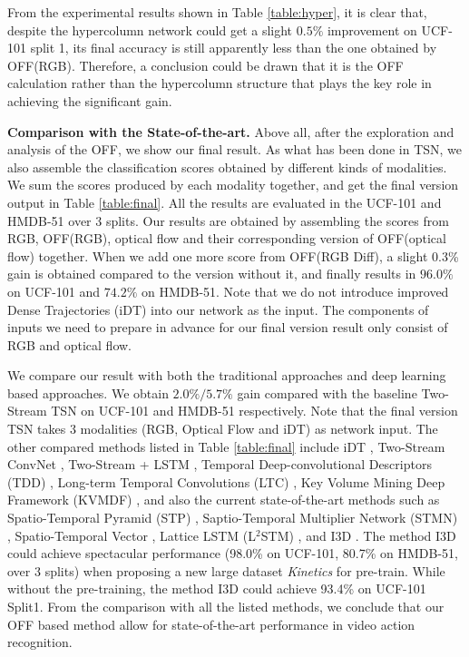 \documentclass[10pt,twocolumn,letterpaper]{article}
\begin{document}
From the experimental results shown in Table \ref{table:hyper}, it is clear that, despite the hypercolumn network could get a slight $0.5\%$ improvement on UCF-101 split 1, its final accuracy is still apparently less than the one obtained by OFF(RGB). Therefore, a conclusion could be drawn that it is the OFF calculation rather than the hypercolumn  structure that plays the key role in achieving the significant gain.

\textbf{Comparison with the State-of-the-art.} Above all, after the exploration and analysis of the OFF, we show our final result. As what has been done in TSN, we also assemble the classification scores obtained by different kinds of modalities. We sum the scores produced by each modality together, and get the final version output in Table \ref{table:final}. All the results are evaluated in the UCF-101 and HMDB-51 over 3 splits. Our results are obtained by assembling the scores from RGB, OFF(RGB), optical flow and their corresponding version of OFF(optical flow) together. When we add one more score from OFF(RGB Diff), a slight 0.3\% gain is obtained compared to the version without it, and finally results in $96.0\%$ on UCF-101 and $74.2\%$ on HMDB-51. Note that we do not introduce improved Dense Trajectories (iDT)\cite{wang2013idt} into our network as the input. The components of inputs we need to prepare in advance  for our final version result only consist of RGB and optical flow.


We compare our result with both the traditional approaches and deep learning based approaches. We obtain $2.0\%/5.7\%$ gain compared with the baseline Two-Stream TSN \cite{wang2016tsn} on UCF-101 \cite{khu2012ucf101} and HMDB-51 \cite{Kuehne11hmdb} respectively. Note that the final version TSN takes 3 modalities (RGB, Optical Flow and iDT) as network input. The other compared methods listed in Table \ref{table:final} include iDT \cite{wang2013idt}, Two-Stream ConvNet \cite{simonyan2014two}, Two-Stream + LSTM \cite{yue2015beyondshortlstm}, Temporal Deep-convolutional Descriptors (TDD) \cite{wang2015tdd}, Long-term Temporal Convolutions (LTC) \cite{varol2017ltc}, Key Volume Mining Deep Framework (KVMDF) \cite{zhu2016kvmf}, and also the current state-of-the-art methods such as Spatio-Temporal Pyramid (STP) \cite{wang2017spatiotemporalpyramid}, Saptio-Temporal Multiplier Network (STMN) \cite{feichtenhofer2017spatio-temp-multiplier}, Spatio-Temporal Vector \cite{cosmin2017stvector}, Lattice LSTM (L$^2$STM) \cite{sun2017lattice}, and I3D \cite{carreira2017i3d}. The method I3D could achieve spectacular performance (98.0\% on UCF-101, 80.7\% on HMDB-51, over 3 splits) when proposing a new large dataset \textit{Kinetics} for pre-train. While without the pre-training, the method I3D could achieve 93.4\% on UCF-101 Split1. From the comparison with all the listed methods, we conclude that our OFF based method allow for state-of-the-art performance in video action recognition.
\end{document}
